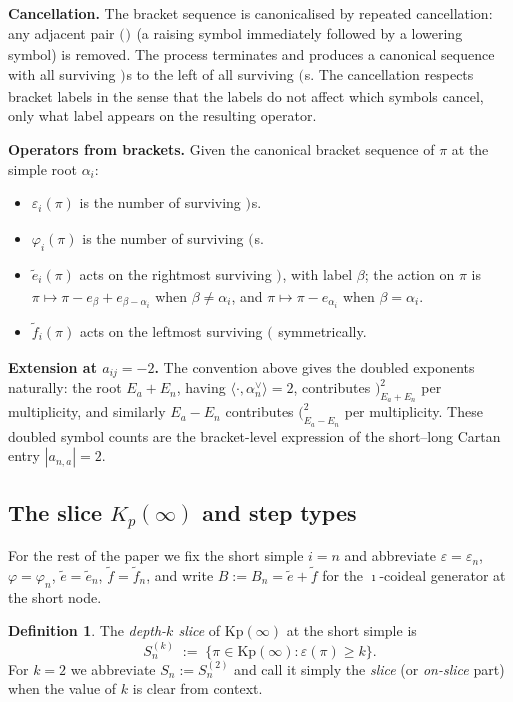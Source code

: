 \documentclass[11pt]{article}
\theoremstyle{definition}
\newtheorem{definition}[theorem]{Definition}
\theoremstyle{remark}
\newcommand{\Kp}{\mathrm{Kp}}
\newcommand{\labr}[1]{{)}_{#1}}
\newcommand{\labl}[1]{{(}_{#1}}
\begin{document}
\medskip
\noindent\textbf{Cancellation.}
The bracket sequence is canonicalised by repeated cancellation: any adjacent pair $\labl{}
\labr{}$ (a raising symbol immediately followed by a lowering symbol) is removed. The
process terminates and produces a canonical sequence with all surviving $\labr{}$s to the
left of all surviving $\labl{}$s. The cancellation respects bracket labels in the sense that
the labels do not affect which symbols cancel, only what label appears on the resulting
operator.

\medskip
\noindent\textbf{Operators from brackets.}
Given the canonical bracket sequence of $\pi$ at the simple root $\alpha_i$:
\begin{itemize}[leftmargin=2em]
  \item $\varepsilon_i(\pi)$ is the number of surviving $\labr{}$s.
  \item $\varphi_i(\pi)$ is the number of surviving $\labl{}$s.
  \item $\tilde e_i(\pi)$ acts on the rightmost surviving $\labr{}$, with label $\beta$; the
    action on $\pi$ is $\pi \mapsto \pi - e_\beta + e_{\beta - \alpha_i}$ when $\beta \neq
    \alpha_i$, and $\pi \mapsto \pi - e_{\alpha_i}$ when $\beta = \alpha_i$.
  \item $\tilde f_i(\pi)$ acts on the leftmost surviving $\labl{}$ symmetrically.
\end{itemize}

\medskip
\noindent\textbf{Extension at $a_{ij} = -2$.}
The convention above gives the doubled exponents naturally: the root $E_a + E_n$, having
$\langle \cdot, \alpha_n^\vee\rangle = 2$, contributes $\labr{E_a + E_n}^2$ per multiplicity,
and similarly $E_a - E_n$ contributes $\labl{E_a - E_n}^2$ per multiplicity. These doubled
symbol counts are the bracket-level expression of the short--long Cartan entry $|a_{n,a}|
= 2$.

\subsection{The slice $K_p(\infty)$ and step types}\label{ssec:slice}

For the rest of the paper we fix the short simple $i = n$ and abbreviate $\varepsilon =
\varepsilon_n$, $\varphi = \varphi_n$, $\tilde e = \tilde e_n$, $\tilde f = \tilde f_n$, and
write $B := B_n = \tilde e + \tilde f$ for the $\imath$-coideal generator at the short node.

\begin{definition}\label{def:slice}
The \emph{depth-$k$ slice} of $\Kp(\infty)$ at the short simple is
\[
S_n^{(k)} \;:=\; \{\pi \in \Kp(\infty) : \varepsilon(\pi) \geq k\}.
\]
For $k = 2$ we abbreviate $S_n := S_n^{(2)}$ and call it simply the \emph{slice} (or
\emph{on-slice} part) when the value of $k$ is clear from context.
\end{definition}
\end{document}
